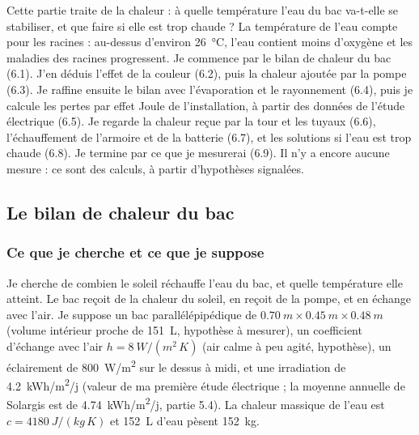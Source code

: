 \clearpage
{}

Cette partie traite de la chaleur : à quelle température l'eau du bac va-t-elle se stabiliser, et que faire si elle est trop chaude ? La température de l'eau compte pour les racines : au-dessus d'environ \qty{26}{\celsius}, l'eau contient moins d'oxygène et les maladies des racines progressent. Je commence par le bilan de chaleur du bac (6.1). J'en déduis l'effet de la couleur (6.2), puis la chaleur ajoutée par la pompe (6.3). Je raffine ensuite le bilan avec l'évaporation et le rayonnement (6.4), puis je calcule les pertes par effet Joule de l'installation, à partir des données de l'étude électrique (6.5). Je regarde la chaleur reçue par la tour et les tuyaux (6.6), l'échauffement de l'armoire et de la batterie (6.7), et les solutions si l'eau est trop chaude (6.8). Je termine par ce que je mesurerai (6.9). Il n'y a encore aucune mesure : ce sont des calculs, à partir d'hypothèses signalées.

\subsection{Le bilan de chaleur du bac}

\subsubsection*{Ce que je cherche et ce que je suppose}

Je cherche de combien le soleil réchauffe l'eau du bac, et quelle température elle atteint. Le bac reçoit de la chaleur du soleil, en reçoit de la pompe, et en échange avec l'air. Je suppose un bac parallélépipédique de $\qty{0,70}{m} \times \qty{0,45}{m} \times \qty{0,48}{m}$ (volume intérieur proche de \qty{151}{L}, hypothèse à mesurer), un coefficient d'échange avec l'air $h = \qty{8}{W/(m^2\,K)}$ (air calme à peu agité, hypothèse), un éclairement de \qty{800}{W/m^2} sur le dessus à midi, et une irradiation de \qty{4,2}{kWh/m^2/j} (valeur de ma première étude électrique ; la moyenne annuelle de Solargis est de \qty{4,74}{kWh/m^2/j}, partie 5.4). La chaleur massique de l'eau est $c = \qty{4180}{J/(kg\,K)}$ et \qty{152}{L} d'eau pèsent \qty{152}{kg}.

